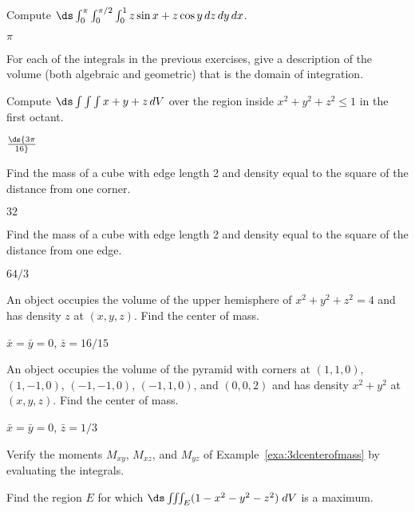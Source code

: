 \begin{enumialphparenastyle}
\begin{ex}
Compute $\ds
\int_0^\pi\int_0^{\pi/2}\int_0^1 z\sin x+z\cos y\,dz\,dy\,dx$.
\begin{sol}
$\pi$
\end{sol}
\end{ex}

\begin{ex}
For each of the integrals in the previous exercises, give a
description of the volume (both algebraic and geometric) that is the
domain of integration.
\end{ex}

\begin{ex}
Compute $\ds\int\int\int
x+y+z\,dV$ over the region inside
$x^2+y^2+z^2\le 1$ in the first octant.
\begin{sol}
$\ds {3\pi\over16}$
\end{sol}
\end{ex}

\begin{ex}
Find the mass of a cube with edge length 2 and density equal
to the square of the distance from one corner.
\begin{sol}
$32$
\end{sol}
\end{ex}

\begin{ex}
Find the mass of a cube with edge length 2 and density equal
to the square of the distance from one edge.
\begin{sol}
$64/3$
\end{sol}
\end{ex}

\begin{ex}
An object occupies the volume of the upper hemisphere of 
$x^2+y^2+z^2=4$ and has density $z$ at $(x,y,z)$. Find the center of mass.
\begin{sol}
$\bar x=\bar y=0$, $\bar z=16/15$
\end{sol}
\end{ex}

\begin{ex}
An object occupies the volume of the pyramid with corners at 
$(1,1,0)$, $(1,-1,0)$, $(-1,-1,0)$, $(-1,1,0)$, and $(0,0,2)$ and has
density $x^2+y^2$ at $(x,y,z)$. Find the center of mass.
\begin{sol}
$\bar x=\bar y=0$, $\bar z=1/3$
\end{sol}
\end{ex}

\begin{ex}
Verify the moments $M_{xy}$, $M_{xz}$, and $M_{yz}$
of Example~\ref{exa:3dcenterofmass} by evaluating the
integrals. 
\end{ex}

\begin{ex}
Find the region $E$ for which $\ds\iiint_E
  (1-x^2-y^2-z^2) \; dV$ is a maximum.
\end{ex}

\end{enumialphparenastyle}